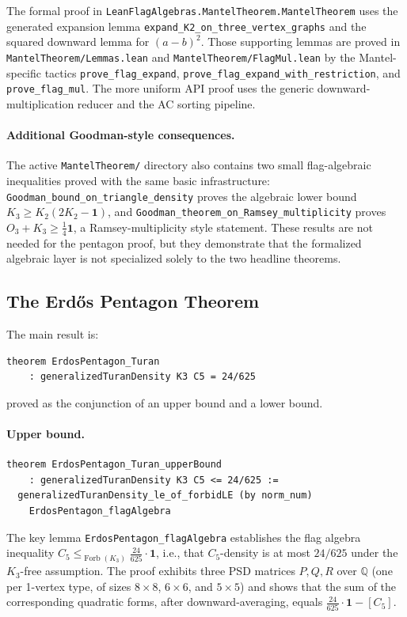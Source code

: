 \documentclass{article}
\newcommand{\forbLE}[1]{\leq_{\operatorname{Forb}(#1)}}
\newcommand{\lean}[1]{\texttt{#1}}
\begin{document}
The formal proof in \lean{LeanFlagAlgebras.MantelTheorem.MantelTheorem} uses
the generated expansion lemma \lean{expand\_K2\_on\_three\_vertex\_graphs} and
the squared downward lemma for $(a-b)^2$.
Those supporting lemmas are proved in \lean{MantelTheorem/Lemmas.lean} and
\lean{MantelTheorem/FlagMul.lean} by the Mantel-specific tactics
\lean{prove\_flag\_expand}, \lean{prove\_flag\_expand\_with\_restriction},
and \lean{prove\_flag\_mul}.  The more uniform API proof uses the generic
downward-multiplication reducer and the AC sorting pipeline.

\paragraph{Additional Goodman-style consequences.}
The active \lean{MantelTheorem/} directory also contains two small
flag-algebraic inequalities proved with the same basic infrastructure:
\lean{Goodman\_bound\_on\_triangle\_density} proves the algebraic lower bound
$K_3 \geq K_2(2K_2-\mathbf{1})$, and
\lean{Goodman\_theorem\_on\_Ramsey\_multiplicity} proves
$O_3 + K_3 \geq \frac14\mathbf{1}$, a Ramsey-multiplicity style statement.
These results are not needed for the pentagon proof, but they demonstrate that
the formalized algebraic layer is not specialized solely to the two headline
theorems.

\subsection{The Erd\H{o}s Pentagon Theorem}

The main result is:
\begin{lstlisting}
theorem ErdosPentagon_Turan
    : generalizedTuranDensity K3 C5 = 24/625
\end{lstlisting}
proved as the conjunction of an upper bound and a lower bound.

\paragraph{Upper bound.}
\begin{lstlisting}
theorem ErdosPentagon_Turan_upperBound
    : generalizedTuranDensity K3 C5 <= 24/625 :=
  generalizedTuranDensity_le_of_forbidLE (by norm_num)
    ErdosPentagon_flagAlgebra
\end{lstlisting}
The key lemma \lean{ErdosPentagon\_flagAlgebra} establishes the flag algebra
inequality $C_5 \forbLE{K_3} \frac{24}{625} \cdot \mathbf{1}$, i.e., that
$C_5$-density is at most $24/625$ under the $K_3$-free assumption.
The proof exhibits three PSD matrices $P, Q, R$ over $\mathbb{Q}$
(one per 1-vertex type, of sizes $8\times 8$, $6\times 6$, and $5\times 5$)
and shows that the sum of the
corresponding quadratic forms, after downward-averaging, equals
$\frac{24}{625} \cdot \mathbf{1} - [C_5]$.
\end{document}
